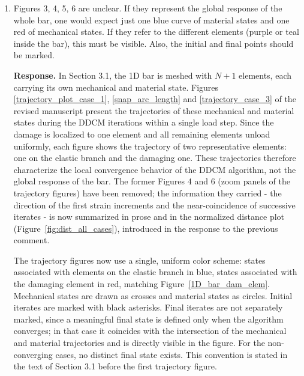 \documentclass[10pt]{article}
\begin{document}
\begin{enumerate}
Beyond these four cases, the characteristic polynomial of $\mathbf{A}\mathbf{C}$ in the arc-length setting yields a closed-form bound equation~\eqref{eq:c2_bound},  a derivation made possible by the substitution of the discrete database by the underlying analytical model: under snapback, the AM fixed-point map is contractive only when $C_2$ is strictly negative ($<-E/N$). No positive hyper-parameter is admissible, and $C_2 = m$ is the unique interpretable derivative of the constitutive response that lies in the admissible range. Figure \ref{bad_metric_no_snap} is therefore one entry in a complete analytical map, and the behavior it displays is the predicted signature of the only $C_2 > 0$ case that even converges in principle.

\color{black}

\item Figures 3, 4, 5, 6 are unclear. If they represent the global response of the whole bar, one would expect just one blue curve of material states and one red of mechanical states. If they refer to the different elements (purple or teal inside the bar), this must be visible. Also, the initial and final points should be marked.

\color{blue}
\textbf{Response.} In Section 3.1, the 1D bar is meshed with $N+1$ elements, each carrying its own mechanical and material state. Figures \ref{trajectory_plot_case_1}, \ref{snap_arc_length} and \ref{trajectory_case_3} of the revised manuscript present the trajectories of these mechanical and material states during the DDCM iterations within a single load step. Since the damage is localized to one element and all remaining elements unload uniformly, each figure shows the trajectory of two representative elements: one on the elastic branch and the damaging one. These trajectories therefore characterize the local convergence behavior of the DDCM algorithm, not the global response of the bar. The former Figures 4 and 6 (zoom panels of the trajectory figures) have been removed; the information they carried - the direction of the first strain increments and the near-coincidence of successive iterates - is now summarized in prose and in the normalized distance plot (Figure~\ref{fig:dist_all_cases}), introduced in the response to the previous comment.

The trajectory figures now use a single, uniform color scheme: states associated with elements on the elastic branch in blue, states associated with the damaging element in red, matching Figure~\ref{1D_bar_dam_elem}. Mechanical states are drawn as crosses and material states as circles. Initial iterates are marked with black asterisks. Final iterates are not separately marked, since a meaningful final state is defined only when the algorithm converges; in that case it coincides with the intersection of the mechanical and material trajectories and is directly visible in the figure. For the non-converging cases, no distinct final state exists. This convention is stated in the text of Section 3.1 before the first trajectory figure.





\end{enumerate}
\end{document}
